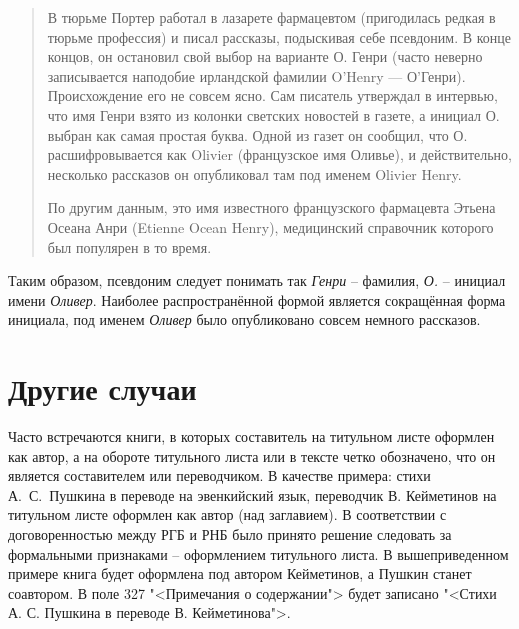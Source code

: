 \begin{quotation}
    В тюрьме Портер работал в лазарете фармацевтом (пригодилась редкая в тюрьме профессия) и писал рассказы, подыскивая себе псевдоним. В конце концов, он остановил свой выбор на варианте О. Генри (часто неверно записывается наподобие ирландской фамилии O’Henry — О’Генри). Происхождение его не совсем ясно. Сам писатель утверждал в интервью, что имя Генри взято из колонки светских новостей в газете, а инициал О. выбран как самая простая буква. Одной из газет он сообщил, что О. расшифровывается как Olivier (французское имя Оливье), и действительно, несколько рассказов он опубликовал там под именем Olivier Henry.
    
    По другим данным, это имя известного французского фармацевта Этьена Осеана Анри (Etienne Ocean Henry), медицинский справочник которого был популярен в то время.
\end{quotation}

Таким образом, псевдоним следует понимать так \textit{Генри} -- фамилия, \textit{О.} -- инициал имени \textit{Оливер}. Наиболее распространённой формой является сокращённая форма инициала, под именем \textit{Оливер} было опубликовано совсем немного рассказов.

\section{Другие случаи}

Часто встречаются книги, в которых составитель на титульном листе оформлен как автор, а на обороте титульного листа или в тексте четко обозначено, что он является составителем или переводчиком. В качестве примера: стихи А.~С.~Пушкина в переводе на эвенкийский язык, переводчик В. Кейметинов на титульном листе оформлен как автор (над заглавием). В соответствии с договоренностью между РГБ и РНБ было принято решение следовать за формальными признаками -- оформлением титульного листа. В вышеприведенном примере книга будет оформлена под автором Кейметинов, а Пушкин станет соавтором. В поле 327 "<Примечания о содержании"> будет записано "<Стихи А. С. Пушкина в переводе В. Кейметинова">.
